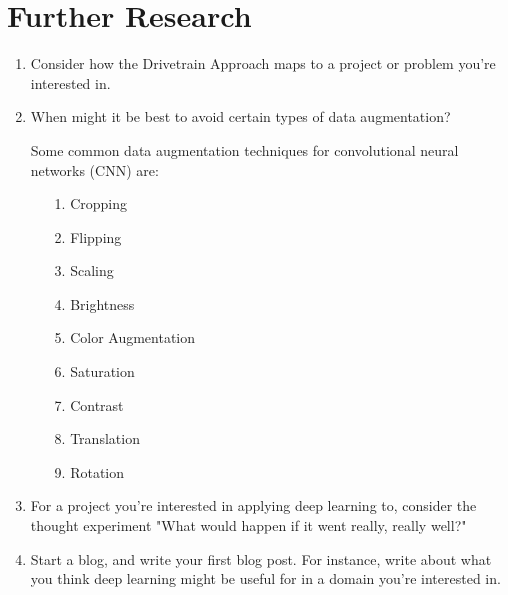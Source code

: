 \documentclass[12pt,a4paper]{article}
\begin{document}
\section*{Further Research}

\begin{enumerate}
\item Consider how the Drivetrain Approach maps to a project or problem you're interested in. \\


\item When might it be best to avoid certain types of data augmentation? \\

\smallbreak

Some common data augmentation techniques for convolutional neural networks (CNN) are:
\begin{itemize}
\item[1.] Cropping \\
\smallbreak

\item[2.] Flipping \\
\smallbreak

\item[3.] Scaling \\
\smallbreak

\item[4.] Brightness \\
\smallbreak

\item[5.] Color Augmentation \\
\smallbreak

\item[6.] Saturation \\
\smallbreak

\item[7.] Contrast \\
\smallbreak

\item[8.] Translation \\
\smallbreak

\item[9.] Rotation \\
\smallbreak

\end{itemize}

\bigbreak

\item For a project you're interested in applying deep learning to, consider the thought experiment "What would happen if it went really, really well?" \\
\item Start a blog, and write your first blog post. For instance, write about what you think deep learning might be useful for in a domain you're interested in. \\
\end{enumerate}
\end{document}
